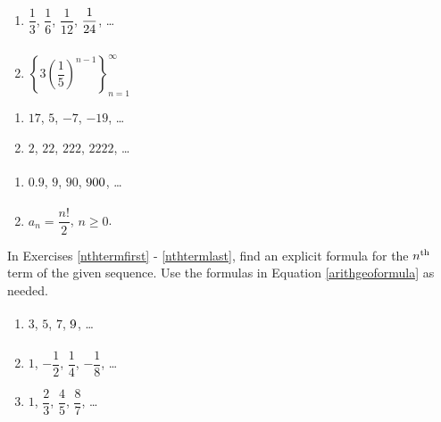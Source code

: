 \begin{multicols}{2}
\begin{enumerate}
\setcounter{enumi}{\value{HW}}


\item  $\dfrac{1}{3}$, $\dfrac{1}{6}$, $\dfrac{1}{12}$, $\dfrac{1}{24} \vphantom{\left\{ 3 \left(\dfrac{1}{5}\right)^{n-1} \right\}_{n=1}^{\infty}}$, \ldots

\item  $\left\{ 3 \left(\dfrac{1}{5}\right)^{n-1} \right\}_{n=1}^{\infty}$

\setcounter{HW}{\value{enumi}}
\end{enumerate}
\end{multicols}

\begin{multicols}{2}
\begin{enumerate}
\setcounter{enumi}{\value{HW}}


\item  $17$, $5$, $-7$, $-19$, \ldots

\item  $2$, $22$, $222$, $2222$, \ldots

\setcounter{HW}{\value{enumi}}
\end{enumerate}
\end{multicols}

\begin{multicols}{2}
\begin{enumerate}
\setcounter{enumi}{\value{HW}}

\item  $0.9$, $9$, $90$, $900 \vphantom{a_{n} = \dfrac{n!}{2}}$, \ldots

\item  $a_{n} = \dfrac{n!}{2}$, $n \geq 0$.  \label{alggeoneithlast}


\setcounter{HW}{\value{enumi}}
\end{enumerate}
\end{multicols}


In Exercises \ref{nthtermfirst} - \ref{nthtermlast}, find an explicit formula for the $n^{\mbox{\scriptsize th}}$ term of the given sequence.  Use the formulas in Equation \ref{arithgeoformula} as needed.

\begin{multicols}{3}
\begin{enumerate}
\setcounter{enumi}{\value{HW}}

\item $3$, $5$, $7$, $9 \vphantom{-\dfrac{1}{8}}$, \ldots \label{nthtermfirst}
\item $1$, $-\dfrac{1}{2}$, $\dfrac{1}{4}$, $-\dfrac{1}{8}$, \ldots
\item $1$, $\dfrac{2}{3}$, $\dfrac{4}{5}$, $\dfrac{8}{7}$, \ldots

\setcounter{HW}{\value{enumi}}
\end{enumerate}
\end{multicols}

